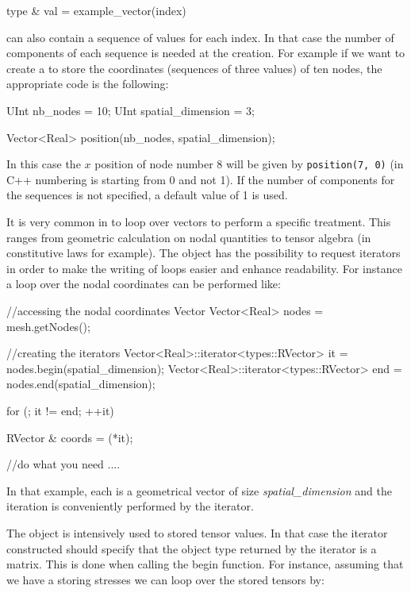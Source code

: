 \begin{cpp}
  type & val = example_vector(index)
\end{cpp}

 can also contain a
sequence of values for each index. In that case the number of components 
of each sequence is needed at the  creation. 
For example if we want to create a  to store
the coordinates (sequences of three values) of ten nodes, the appropriate 
code is the following:
\begin{cpp}
  UInt nb_nodes = 10;
  UInt spatial_dimension = 3;

  Vector<Real> position(nb_nodes, spatial_dimension);
\end{cpp}
In this case the $x$ position of node number 8 will be given by
\texttt{position(7, 0)} (in C++ numbering is starting from 0 and not
1). If the number of components for the sequences is not specified, a
default value of 1 is used. 

It is very common in \akantu to loop over vectors to perform a specific 
treatment. This ranges from geometric calculation on nodal quantities 
to tensor algebra (in constitutive laws for example).
The  object has the possibility to request iterators 
in order to make the writing of loops easier and enhance readability.
For instance a loop over the nodal coordinates can be performed like:
\begin{cpp}
  //accessing the nodal coordinates Vector
  Vector<Real> nodes = mesh.getNodes();
  
  //creating the iterators
  Vector<Real>::iterator<types::RVector> it  = nodes.begin(spatial_dimension);
  Vector<Real>::iterator<types::RVector> end = nodes.end(spatial_dimension);
  
  for (; it != end; ++it){
    RVector & coords = (*it);
    
    //do what you need
    ....
    
  }
\end{cpp}
In that example, each  is a geometrical vector of size \textit{spatial\_dimension}
and the iteration is conveniently performed by the  iterator.

The  object is intensively used to stored tensor values.
In that case the iterator constructed should specify that the object type
returned by the iterator is a matrix. This is done when calling the 
begin function. For instance, assuming that we have a  storing 
stresses we can loop over the stored tensors by:

